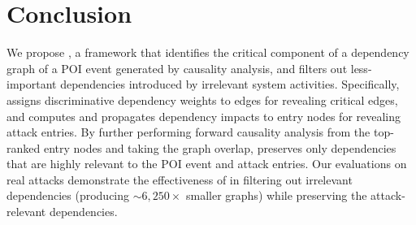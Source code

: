 \section{Conclusion}
We propose \tool, a framework that identifies the critical component of 
a dependency graph of a POI event generated by causality analysis, and filters out less-important dependencies introduced by irrelevant system activities.
%
Specifically, \tool assigns discriminative dependency weights to edges for revealing critical edges, and computes and propagates dependency impacts to entry nodes for revealing attack entries. 
By further performing forward causality analysis from the top-ranked entry nodes and taking the graph overlap, \tool preserves only dependencies that are highly relevant to the POI event and attack entries.
Our evaluations on real attacks demonstrate the effectiveness of \tool in filtering out irrelevant dependencies (producing $\sim6,250\times$ smaller graphs) while preserving the attack-relevant dependencies.




